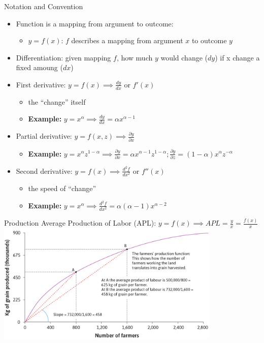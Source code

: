 \documentclass{beamer}
\begin{document}
\begin{frame}[t]{Notation and Convention}
    \begin{itemize}
	\item Function is a mapping from argument to outcome:
	    \begin{itemize}
	        \item $y = f\left( x \right) $: $f$ describes a mapping from argument $x$ to outcome $y$
	    \end{itemize}
	\item Differentiation: given mapping $f$, how much $y$ would change ($dy$) if x change a fixed amoung  ($dx$)
	\item First derivative: $y = f\left( x \right)  \implies  \frac{dy}{dx} $ or $f'\left( x \right) $
	    \begin{itemize}
		\item the ``change'' itself
	        \item  \textbf{Example:} $y = x^{  \alpha  }  \implies \frac{dy}{dx} =  \alpha x^{ \alpha - 1}  $
	    \end{itemize}
	\item Partial derivative: $y = f\left( x, z \right)  \implies \frac{\partial y}{\partial x} $
	    \begin{itemize}
	    \item  \textbf{Example: } $y = x^{ \alpha } z^{1- \alpha }  \implies \frac{\partial y}{\partial x} =  \alpha x^{ \alpha - 1} z^{1- \alpha }; \frac{\partial y}{\partial z} = \left( 1- \alpha  \right) x^{ \alpha } z^{- \alpha }  $
	    \end{itemize}
	\item Second derivative: $y = f\left( x \right)  \implies \frac{d^{2} f}{dx^{2} } $ or $f''\left( x \right) $
	     \begin{itemize}
		 \item the speed of ``change''
		 \item  \textbf{Example: } $y = x^{ \alpha }  \implies \frac{d^{2} f}{dx^{2} } =  \alpha \left(  \alpha -1 \right) x^{ \alpha -2} $
	     \end{itemize}
    \end{itemize}
\end{frame}

\begin{frame}[t]{Production}
    Average Production of Labor (APL): $y = f\left( x \right)  \implies APL = \frac{y}{x} = \frac{f\left( x \right) }{x} $
    \centering
    \includegraphics[width=0.8\textwidth]{./figures/production-1.png}
\end{frame}
\end{document}

